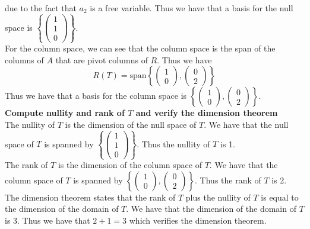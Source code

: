 \documentclass[answers,12pt,addpoints]{exam}
\begin{document}
due to the fact that $a_2$ is a free variable.
Thus we have that a basis for the null space is $\left\{ \begin{pmatrix}
1 \\ 1 \\ 0
\end{pmatrix} \right\}$.\\
For the column space, we can see that the column space is the span of the columns of $A$ that are pivot columns of $R$. Thus we have
$$ R(T) = \text{span} \left\{ \begin{pmatrix}
1 \\ 0
\end{pmatrix}, \begin{pmatrix}
0 \\ 2
\end{pmatrix} \right\} $$
Thus we have that a basis for the column space is $\left\{ \begin{pmatrix}
1 \\ 0
\end{pmatrix}, \begin{pmatrix}
0 \\ 2
\end{pmatrix} \right\}$.\\



\textbf{Compute nullity and rank of $T$ and verify the dimension theorem}\\
The nullity of $T$ is the dimension of the null space of $T$. We have that the null space of $T$ is spanned by $\left\{ \begin{pmatrix}
1 \\ 1 \\ 0
\end{pmatrix} \right\}$. Thus the nullity of $T$ is 1.\\
The rank of $T$ is the dimension of the column space of $T$. We have that the column space of $T$ is spanned by $\left\{ \begin{pmatrix}
1 \\ 0
\end{pmatrix}, \begin{pmatrix}
0 \\ 2
\end{pmatrix} \right\}$. Thus the rank of $T$ is 2.\\
The dimension theorem states that the rank of $T$ plus the nullity of $T$ is equal to the dimension of the domain of $T$. We have that the dimension of the domain of $T$ is 3. Thus we have that $2 + 1 = 3$ which verifies the dimension theorem.\\
\end{document}
